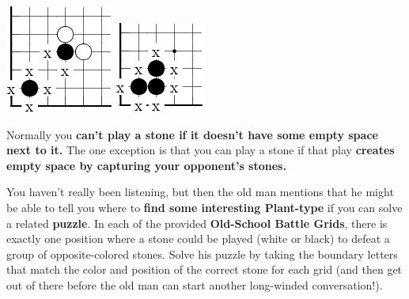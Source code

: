 \begin{center}
  \includegraphics{gogetem/assets/explanation3-crop}
  \includegraphics{gogetem/assets/explanation4-crop}
\end{center}

Normally you \textbf{can't play a stone if it doesn't have some empty space next
to it.} The one exception is that you can play a stone if that play
\textbf{creates empty space by capturing your opponent's stones.} 

You haven't really been listening, but then the old man mentions that he
might be able to tell you where to \textbf{find some interesting Plant-type
\mappMobimon{}} if you can solve a related \textbf{puzzle}.
In each of the provided \textbf{Old-School \mappMobimon{} Battle Grids},
there is exactly one position where a stone
could be played (white or black) to defeat a group of opposite-colored stones.
Solve his puzzle by taking the boundary letters
that match the color and position of the correct stone for each grid
(and then get out of there before the old man can start another long-winded
conversation!).


